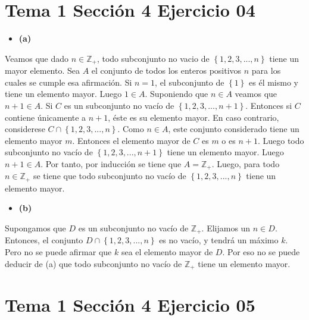 \documentclass{article}
\begin{document}
\section{Tema 1 Sección 4 Ejercicio 04}
\begin{itemize}
\item \bf (a) \rm 
\end{itemize}
Veamos que dado \(n \in\mathbb{Z}_{+}\), todo subconjunto no vacio de \(\left\{1,2,3,...,n\right\}\)
tiene un mayor elemento. Sea \(A\) el conjunto de todos los enteros positivos \(n\) para los cuales se cumple esa afirmación. Si \(n=1\), el subconjunto de \(\left\{1\right\}\) es él mismo y tiene un elemento mayor. Luego \(1\in A\). Suponiendo que \(n\in  A\) veamos que \(n+1\in A\). Si
\(C\) es un subconjunto no vacío de \(\left\{1,2,3,...,n+1\right\}\). Entonces si \(C\) contiene únicamente a \(n+1\), éste es su elemento mayor. En caso contrario, considerese \(C\cap\left\{1,2,3,...,n\right\}\). Como \(n\in A\), este conjunto considerado tiene un elemento mayor \(m\). Entonces el elemento mayor de \(C\) es \(m\) o es \(n+1\). Luego todo subconjunto no vacío de \(\left\{1,2,3,...,n+1\right\}\) tiene un elemento mayor. Luego  \(n+1\in A\). Por tanto, por inducción se tiene que \(A =\mathbb{Z}_{+}\). Luego, para todo \(n\in \mathbb{Z}_{+}\) se tiene que todo subconjunto no vacío de \(\left\{1,2,3,...,n\right\}\)
tiene un elemento mayor.
\begin{itemize} 
\item \bf (b) \rm 
\end{itemize}
Supongamos que \(D\) es un subconjunto no vacío de \(\mathbb{Z}_{+}\). Elijamos un \(n\in D\). Entonces, el conjunto  \(D\cap\left\{1,2,3,...,n\right\}\) es no vacío, y tendrá un máximo \(k\). Pero no se puede afirmar que \(k\) sea el elemento mayor de \(D\). Por eso no se puede deducir de (a) que todo subconjunto no vacío de \(\mathbb{Z}_{+}\) tiene un elemento mayor.

\section{Tema 1 Sección 4 Ejercicio 05}
\end{document}
